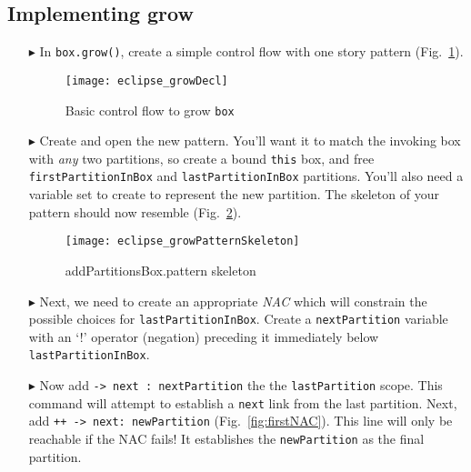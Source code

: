 \clearpage
\hypertarget{growBox tex}{}
\subsection{Implementing grow}
\texHeader

\vspace*{0.5cm}

\begin{itemize}

\item[$\blacktriangleright$] In \texttt{box.grow()}, create a simple control flow with one story pattern (Fig.~\ref{fig:growDecl}). 

\begin{figure}[htbp]
\begin{center}
  \texttt{[image: eclipse\_growDecl]}
  \caption{Basic control flow to grow \texttt{box}}
  \label{fig:growDecl}
\end{center}
\end{figure}

\item[$\blacktriangleright$] Create and open the new pattern. You'll want it to match the invoking box with \emph{any} two partitions, so create a bound
\texttt{this} box, and free \texttt{firstPartitionInBox} and \texttt{lastPartitionInBox} partitions. You'll also need a variable set to create to represent the
new partition. The skeleton of your pattern should now resemble (Fig.~\ref{fig:growPattSkel}).

\vspace{0.5cm}

\begin{figure}[htbp]
\begin{center}
  \texttt{[image: eclipse\_growPatternSkeleton]}
  \caption{addPartitionsBox.pattern skeleton}
  \label{fig:growPattSkel}
\end{center}
\end{figure}

\item[$\blacktriangleright$] Next, we need to create an appropriate \emph{NAC} which will constrain the possible choices for \texttt{lastPartitionInBox}.
Create a \texttt{nextPartition} variable with an `!' operator (negation) preceding it immediately below \texttt{last\-Part\-it\-ion\-In\-Box}.

\vspace{0.5cm}

\item[$\blacktriangleright$] Now add \texttt{-> next : nextPartition} the the \texttt{lastPartition} scope. This
command will attempt to establish a \texttt{next} link from the last partition. Next, add \texttt{++ -> next: newPartition} (Fig.~\ref{fig:firstNAC}).
This line will only be reachable if the NAC fails! It establishes the \texttt{newPartition} as the final partition.


\end{itemize}
